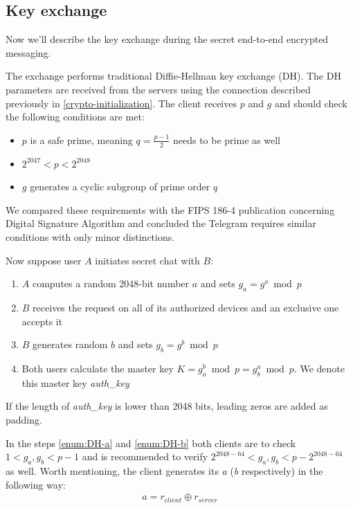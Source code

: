 \documentclass[thesis=M,english]{FITthesis}[2012/10/20]
\begin{document}
\subsection{Key exchange}

Now we'll describe the key exchange during the secret end-to-end encrypted messaging.

The exchange performs traditional Diffie-Hellman key exchange (DH). The DH parameters are received from the servers using the connection described previously in \ref{crypto-initialization}. The client receives $p$ and $g$ and should check the following conditions are met:

\begin{itemize}
	\item $p$ is a safe prime, meaning $q = \frac{p-1}{2}$ needs to be prime as well
	\item $2^{2047} < p < 2^{2048}$
	\item $g$ generates a cyclic subgroup of prime order $q$
\end{itemize}

We compared these requirements with the FIPS 186-4 publication concerning Digital Signature Algorithm and concluded the Telegram requires similar conditions with only minor distinctions.

Now suppose user $A$ initiates secret chat with $B$:

\begin{enumerate}
	\item $A$ computes a random 2048-bit number $a$ and sets $g_a = g^a \bmod p$\label{enum:DH-a}
	\item $B$ receives the request on all of its authorized devices and an exclusive one accepts it
	\item $B$ generates random $b$ and sets $g_b = g^b \bmod p$\label{enum:DH-b}
	\item Both users calculate the master key $K = g_a^b \bmod p = g_b^a \bmod p$. We denote this master key \emph{auth\_key}
\end{enumerate}

If the length of \emph{auth\_key} is lower than 2048 bits, leading zeros are added as padding.

In the steps \ref{enum:DH-a} and \ref{enum:DH-b} both clients are to check $1 < g_a, g_b < p-1$ and is recommended to verify $2^{2048-64} < g_a, g_b < p - 2^{2048-64}$ as well. Worth mentioning, the client generates its \emph{a} (\emph{b} respectively) in the following way:
\begin{gather*}
a = r_{client} \oplus r_{server}
\end{gather*}
\end{document}
